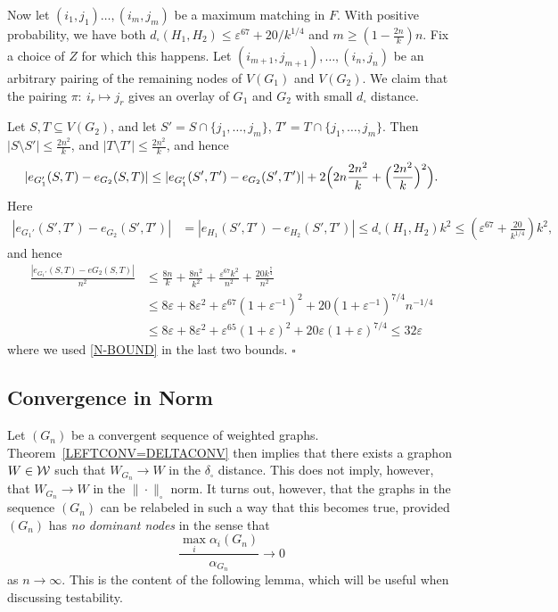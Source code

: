 \documentclass[12pt]{article}
\numberwithin{equation}{section}
\def\eps{\varepsilon}
\begin{document}
Now let $(i_1,j_1)\dots, (i_m,j_m)$ be a maximum matching in $F$.
With positive probability, we have both $d_\square(H_1,H_2)\le
\eps^{ 67}+{ 20}/k^{1/4}$ and
$m\ge (1-\frac{2n}{k})n$. Fix a choice of
$Z$ for which this happens. Let $(i_{m+1},j_{m+1}),\dots,(i_n,j_n)$
be an arbitrary pairing of the remaining nodes of $V(G_1)$ and
$V(G_2)$. We claim that the pairing $\pi:~i_r\mapsto j_r$ gives an
overlay of $G_1$ and $G_2$ with small $d_\square$ distance.

Let $S,T\subseteq V(G_2)$, and let $S'=S\cap\{j_1,\dots,j_m\}$,
$T'=T\cap\{j_1,\dots,j_m\}$. Then $|S\setminus S'|\le\frac{2n^2}{k}$,
and $|T\setminus T'|\le\frac{2n^2}{k}$, and hence
\[
|e_{G_1'}(S,T)-e_{G_2}(S,T)| \le |e_{G_1'}(S',T')-e_{G_2}(S',T')|
+2\Bigl(2 n \frac{2n^2}{k}+\Bigl(\frac{2n^2}{k}\Bigr)^2\Bigr).
\]
Here
\begin{align*}
|e_{G_1'}(S',T')-e_{G_2}(S',T')| &=  |e_{H_1}(S',T')-e_{H_2}(S',T')|
\le d_\square(H_1,H_2)k^2
\le (\eps^{ 67}+\frac{{20}}{k^{1/4}}) k^2,
\end{align*}
and hence
\[
\begin{aligned}
\frac{|e_{G_1'}(S,T)-e{G_2}(S,T)|}{n^2}
&\le
{\frac{8n}k+\frac{8n^2}{k^2}}
+\frac{\eps^{ 67} k^2}{n^2} + \frac{{ 20}k^{\frac{7}{4}}}{n^2}
\\
&\le
{8\eps+8\eps^2 +
    \eps^{67}(1+\eps^{-1})^2 + 20(1+\eps^{-1})^{7/4}
    n^{-1/4}
    }
\\
&{\leq 8\eps+8\eps^2 +
    \eps^{65}(1+\eps)^2 + 20\eps(1+\eps)^{7/4}
    \leq 32\eps
    }
\end{aligned}
\]
where we used \eqref{N-BOUND} in the last two bounds.
\hfill$\square$




\subsection{Convergence in Norm}
\label{sec:Norm-Conv}

Let $(G_n)$ be a convergent sequence of weighted graphs.
Theorem~\ref{LEFTCONV=DELTACONV} then implies that there  exists a
graphon $W\in {\cal W}$ such that $W_{G_n}\to W$ in the $\delta_\square$
distance. This does not imply, however, that $W_{G_n}\to W$ in the
$\|\cdot\|_\square$ norm. It turns out, however, that the graphs in
the sequence $(G_n)$ can be relabeled in such a way that this becomes
true, provided $(G_n)$ has {\it no dominant nodes} in the sense
that
\[
\frac {\max_i\alpha_i(G_n)}{\alpha_{G_n}}\to 0
\]
as $n\to\infty$. This is the content of the following lemma, which
will be useful when discussing testability.
\end{document}
